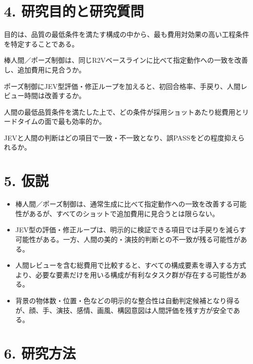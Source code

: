 \documentclass[11pt,a4paper]{article}
\begin{document}
\section*{4. 研究目的と研究質問}
目的は、品質の最低条件を満たす構成の中から、最も費用対効果の高い工程条件を特定することである。
\begin{description}[style=nextline,leftmargin=0pt]
\item[RQ1] 棒人間／ポーズ制御は、同じR2Vベースラインに比べて指定動作への一致を改善し、追加費用に見合うか。
\item[RQ2] ポーズ制御にJEV型評価・修正ループを加えると、初回合格率、手戻り、人間レビュー時間は改善するか。
\item[RQ3] 人間の最低品質条件を満たした上で、どの条件が採用ショットあたり総費用とリードタイムの面で最も効率的か。
\item[RQ4] JEVと人間の判断はどの項目で一致・不一致となり、誤PASSをどの程度抑えられるか。
\end{description}

\section*{5. 仮説}
\begin{itemize}[nosep]
\item[H1.] 棒人間／ポーズ制御は、通常生成に比べて指定動作への一致を改善する可能性があるが、すべてのショットで追加費用に見合うとは限らない。
\item[H2.] JEV型の評価・修正ループは、明示的に検証できる項目では手戻りを減らす可能性がある。一方、人間の美的・演技的判断との不一致が残る可能性がある。
\item[H3.] 人間レビューを含む総費用で比較すると、すべての構成要素を導入する方式より、必要な要素だけを用いる構成が有利なタスク群が存在する可能性がある。
\item[H4.] 背景の物体数・位置・色などの明示的な整合性は自動判定候補となり得るが、顔、手、演技、感情、画風、構図意図は人間評価を残す方が安全である。
\end{itemize}

\section*{6. 研究方法}
\end{document}
